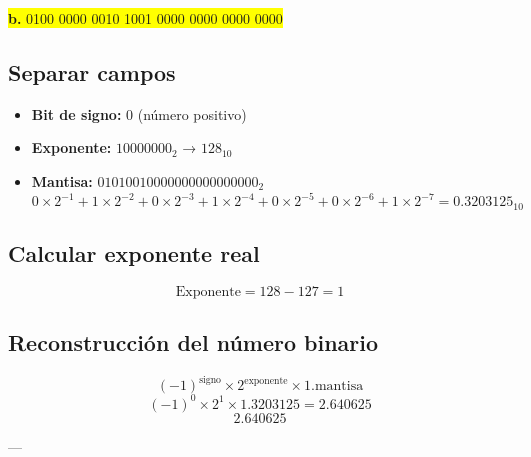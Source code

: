 \documentclass[a4paper,12pt]{article}
\begin{document}
		\begin{center}
		\colorbox{yellow}{\textbf{b.} 0100 0000 0010 1001 0000 0000 0000 0000}
		
		\subsection*{Separar campos}
		
		\begin{itemize}
			\item \textbf{Bit de signo:} 0 (número positivo)
			\item \textbf{Exponente:} $10000000_2$ → $128_{10}$
			\item \textbf{Mantisa:} $01010010000000000000000_2$ 
			\[
			0\times2^{-1} + 1\times2^{-2} + 0\times2^{-3} + 1\times2^{-4} + 0\times2^{-5} + 0\times2^{-6} + 1\times2^{-7} = 0.3203125_{10}
			\]
		\end{itemize}
		
		\subsection*{Calcular exponente real}
		
		\[
		\text{Exponente} = 128 - 127 = 1
		\]
		
		
		
		\subsection*{Reconstrucción del número binario}	
		\[
		(-1)^{\text{signo}} \times 2^{\text{exponente}} \times 1.\text{mantisa}
		\]
		\[
		(-1)^0 \times 2^1 \times 1.3203125 = 2.640625
		\]
		\vspace{1em}
		\[
		\boxed{2.640625}
		\]
		
		---
	\end{center}
\end{document}
